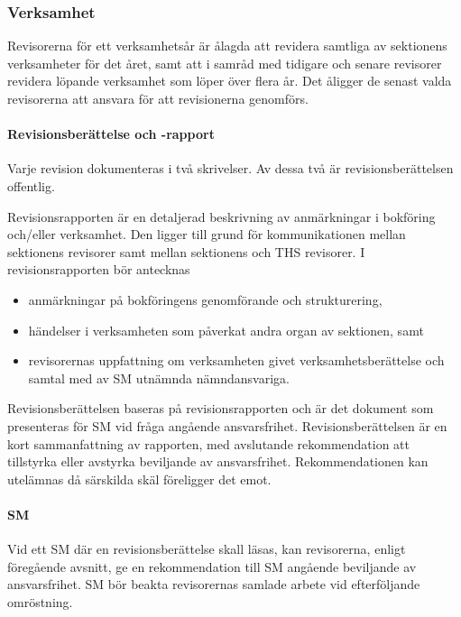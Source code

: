 \documentclass[a4paper,12pt]{article}
\begin{document}
\subsubsection{Verksamhet}

Revisorerna för ett verksamhetsår är ålagda att revidera samtliga av sektionens verksamheter för det året, samt att i samråd med tidigare och senare revisorer revidera löpande verksamhet som löper över flera år. Det åligger de senast valda revisorerna att ansvara för att revisionerna genomförs.

\paragraph{Revisionsberättelse och -rapport}

Varje revision dokumenteras i två skrivelser. Av dessa två är revisionsberättelsen offentlig.

Revisionsrapporten är en detaljerad beskrivning av anmärkningar i bokföring och/eller verksamhet. Den ligger till grund för kommunikationen mellan sektionens revisorer samt mellan sektionens och THS revisorer. I revisionsrapporten bör antecknas

\begin{itemize}
  \item anmärkningar på bokföringens genomförande och strukturering,
  \item händelser i verksamheten som påverkat andra organ av sektionen, samt
  \item revisorernas uppfattning om verksamheten givet verksamhetsberättelse och samtal med av SM utnämnda nämndansvariga.
\end{itemize}

Revisionsberättelsen baseras på revisionsrapporten och är det dokument som presenteras för SM vid fråga angående ansvarsfrihet. Revisionsberättelsen är en kort sammanfattning av rapporten, med avslutande rekommendation att tillstyrka eller avstyrka beviljande av ansvarsfrihet. Rekommendationen kan utelämnas då särskilda skäl föreligger det emot.

\paragraph{SM}

Vid ett SM där en revisionsberättelse skall läsas, kan revisorerna, enligt föregående avsnitt, ge en rekommendation till SM angående beviljande av ansvarsfrihet. SM bör beakta revisorernas samlade arbete vid efterföljande omröstning.
\end{document}
